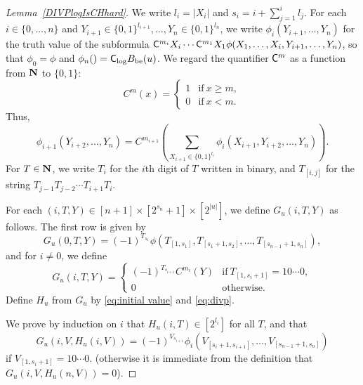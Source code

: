 \begin{proof}[Lemma~\ref{DIVPlogIsCHhard}]
We write $l_i = |X_i|$ and $s_i = i + \sum^i_{j=1}l_j$.
For each $i \in \{0, \dots, n\}$ and
$Y_{i+1} \in \{0,1\}^{l_{i+1}}, \dots, Y_n \in \{0,1\}^{l_n}$,
we write $\phi_i(Y_{i+1}, \dots, Y_n)$ for the truth value of the subformula
$\mathsf{C}^{m_{i}}{X_i} \cdots \mathsf{C}^{m_1}{X_1} \phi(X_1, \dots, X_i, Y_{i+1}, \dots, Y_n)$,
so that $\phi_0 = \phi$ and $\phi_n() = \mathsf{C}_{\log} B_{\mathrm{be}} (u)$.
We regard the quantifier $\mathsf{C}^m$ as a function from $\mathbf N$ to $\{0,1\}$:
\begin{equation}
 C^m(x) 
  = \begin{cases}
     1 & \text{if} \ x \ge m, \\
     0 & \text{if} \ x < m.
    \end{cases}
\end{equation}
Thus,
\begin{equation} \label{eq:phi-step}
 \phi_{i+1}(Y_{i+2}, \dots, Y_n) 
  = C^{m_{i+1}}\left(\sum_{X_{i+1} \in \{ 0,1 \} ^{l_i}}
		\phi_i(X_{i+1}, Y_{i+2}, \dots, Y_{n})\right).
\end{equation}
For $T \in \mathbf N$, we write $T_i$ for the $i$th digit of $T$ written in binary,
and $T_{[i,j]}$ for the string $T_{j-1} T_{j-2} \cdots T_{i+1} T_{i}$.

For each $(i, T, Y) \in [n+1] \times [2^{s_n}+1] \times [2^{|u|}]$,
we define $G_u (i, T, Y)$ as follows.
The first row is given by
 \begin{equation}\label{eq:def-Gu:case0}
  G_u(0,T,Y) = 
   (-1)^{T_{s_1}}\phi(T_{[1,s_1]}, T_{[s_1+1,s_2]},
    \dots, T_{[s_{n-1}+1,s_n]}), 
 \end{equation}
and for $i \neq 0$, we define 
 \begin{equation} 
  G_u(i,T,Y) = 
   \begin{cases}
    (-1)^{T_{s_{i+1}}} C^{m_i}(Y) 
    & \text{if} \ T_{[1,s_i+1]} = 10 \cdots 0, \\
    0 & \text{otherwise}.
   \end{cases} 
   \label{eq:def-Gu:case-nonzero}
 \end{equation}
Define $H_u$ from $G_u$ by \eqref{eq:initial value} and \eqref{eq:divp}.

We prove by induction on $i$ that $H_u(i, T) \in [2^{l_i}]$ for all $T$, and that 
 \begin{equation} \label{eq:subformula}
  G_u(i,V,H_u(i,V)) = (-1)^{V_{s_{i+1}}} 
   \phi_i(V_{[s_i+1, s_{i+1}]}, \dots, V_{[s_{n-1}+1, s_n]})
 \end{equation}
if $V_{[1, s_i +1]} = 10 \cdots 0$.
(otherwise it is immediate from the definition that $G_u(i, V, H_u(n, V)) = 0$).


\end{proof}
